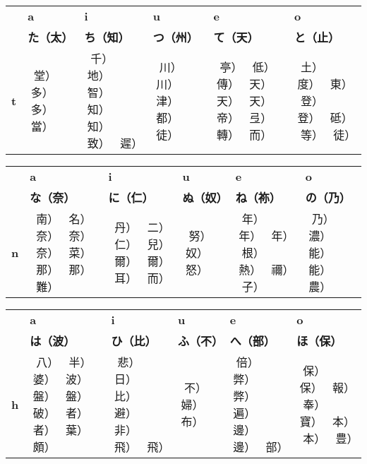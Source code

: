 \begin{center}
\begin{tabular}{m{1.0cm}||m{2.5cm}|m{2.5cm}|m{2.5cm}|m{2.5cm}|m{2.5cm}|}
& \textbf{a}& \textbf{i}& \textbf{u}& \textbf{e}& \textbf{o}\\
& \textbf{た（太）}& \textbf{ち（知）}& \textbf{つ（州）}& \textbf{て（天）}& \textbf{と（止）}\\ \hline \hline
\textbf{t}&\smallskip 𛁞（堂） 𛁟（多） 𛁠（多） 𛁡（當）
          &\smallskip 𛁢（千） 𛁣（地） 𛁤（智） 𛁥（知） 𛁦（知） 𛁧（致） 𛁨（遲）
          &\smallskip 𛁩（川） 𛁪（川） 𛁫（津） 𛁬（都） 𛁭（徒）
          &\smallskip 𛁮（亭） 𛁯（低） 𛁰（傳） 𛁱（天） 𛁲（天） 𛁳（天） 𛁴（帝） 𛁵（弖） 𛁶（轉） 𛂎（而）
          &\smallskip 𛁷（土） 𛁸（度） 𛁹（東） 𛁺（登） 𛁻（登） 𛁼（砥） 𛁽（等） 𛁭（徒） \\ \hline
\end{tabular}

\begin{tabular}{m{1.0cm}||m{2.5cm}|m{2.5cm}|m{2.5cm}|m{2.5cm}|m{2.5cm}|}
& \textbf{a}& \textbf{i}& \textbf{u}& \textbf{e}& \textbf{o}\\
& \textbf{な（奈）}& \textbf{に（仁）}& \textbf{ぬ（奴）}& \textbf{ね（祢）}& \textbf{の（乃）}\\ \hline \hline
\textbf{n}&\smallskip 𛁾（南） 𛁿（名） 𛂀（奈） 𛂁（奈） 𛂂（奈） 𛂃（菜） 𛂄（那） 𛂅（那） 𛂆（難）
          &\smallskip 𛂇（丹） 𛂈（二） 𛂉（仁） 𛂊（兒） 𛂋（爾） 𛂌（爾） 𛂍（耳） 𛂎（而）
          &\smallskip 𛂏（努） 𛂐（奴） 𛂑（怒）
          &\smallskip 𛂒（年） 𛂓（年） 𛂔（年） 𛂕（根） 𛂖（熱） 𛂗（禰） 𛂘（子）
          &\smallskip 𛂙（乃） 𛂚（濃） 𛂛（能） 𛂜（能） 𛂝（農） \\ \hline
\end{tabular}

\begin{tabular}{m{1.0cm}||m{2.5cm}|m{2.5cm}|m{2.5cm}|m{2.5cm}|m{2.5cm}|}
& \textbf{a}& \textbf{i}& \textbf{u}& \textbf{e}& \textbf{o}\\
& \textbf{は（波）}& \textbf{ひ（比）}& \textbf{ふ（不）}& \textbf{へ（部）}& \textbf{ほ（保）}\\ \hline \hline
\textbf{h}&\smallskip 𛂞（八） 𛂟（半） 𛂠（婆） 𛂡（波） 𛂢（盤） 𛂣（盤） 𛂤（破） 𛂥（者） 𛂦（者） 𛂧（葉） 𛂨（頗）
          &\smallskip 𛂩（悲） 𛂪（日） 𛂫（比） 𛂬（避） 𛂭（非） 𛂮（飛） 𛂯（飛）
          &\smallskip 𛂰（不） 𛂱（婦） 𛂲（布）
          &\smallskip 𛂳（倍） 𛂴（弊） 𛂵（弊） 𛂶（遍） 𛂷（邊） 𛂸（邊） 𛂹（部）
          &\smallskip 𛂺（保） 𛂻（保） 𛂼（報） 𛂽（奉） 𛂾（寶） 𛂿（本） 𛃀（本） 𛃁（豊） \\ \hline
\end{tabular}


\end{center}

